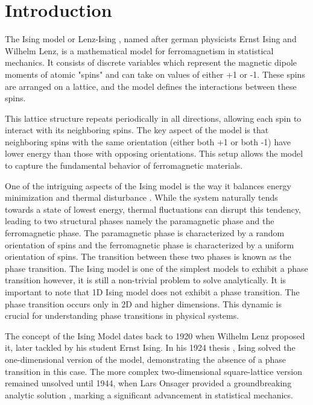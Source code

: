 \section{Introduction}

The Ising model or Lenz-Ising \cite{Ising1925}, named after german physicists
Ernst Ising and Wilhelm Lenz, is a mathematical model for ferromagnetism in
statistical mechanics. It consists of discrete variables which represent the
magnetic dipole moments of atomic "spins" and  can take on values of either
+1 or -1. These spins are arranged on a lattice, and the model defines the
interactions between these spins.

This lattice structure repeats periodically in all directions, allowing each
spin to interact with its neighboring spins. The key aspect of the model is that
neighboring spins with the same orientation (either both +1 or both -1) have
lower energy than those with opposing orientations. This setup allows the model
to capture the fundamental behavior of ferromagnetic materials.

One of the intriguing aspects of the Ising model is the way it balances energy
minimization and thermal disturbance \cite{Chowdhury}. While the system
naturally tends towards a state of lowest energy, thermal fluctuations can
disrupt this tendency, leading to two structural phases namely the paramagnetic
phase and the ferromagnetic phase. The paramagnetic phase is characterized by a
random orientation of spins and the ferromagnetic phase is characterized by a
uniform orientation of spins. The transition between these two phases is known
as the phase transition. The Ising model is one of the simplest models to
exhibit a phase transition however, it is still a non-trivial problem to solve
analytically. It is important to note that 1D Ising model does not exhibit a
phase transition. The phase transition occurs only in 2D \cite{Onsager1944} and
higher dimensions. This dynamic is crucial for understanding phase transitions
in physical systems.

The concept of the Ising Model dates back to 1920 when Wilhelm Lenz proposed it,
later tackled by his student Ernst Ising. In his 1924 thesis \cite{Ising1925},
Ising solved the one-dimensional version of the model, demonstrating the absence
of a phase transition in this case. The more complex two-dimensional
square-lattice version remained unsolved until 1944, when Lars Onsager provided
a groundbreaking analytic solution \cite{Onsager1944}, marking a significant
advancement in statistical mechanics.
